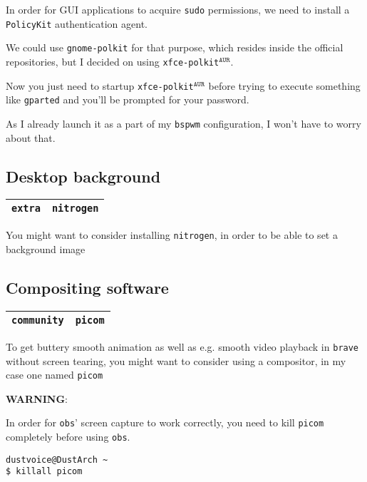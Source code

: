 \documentclass[9pt]{report}
\newcommand{\admonition}[2]{\textbf{#1}: {#2}}
\begin{document}
In order for GUI applications to acquire \texttt{sudo} permissions, we need to install a \texttt{PolicyKit} authentication agent.


We could use \texttt{gnome-polkit} for that purpose, which resides inside the official repositories, but I decided on using \texttt{xfce-polkit}${}^{\texttt{AUR}}$.


Now you just need to startup \texttt{xfce-polkit}${}^{\texttt{AUR}}$ before trying to execute something like \texttt{gparted} and you’ll be prompted for your password.


As I already launch it as a part of my \texttt{bspwm} configuration, I won’t have to worry about that.



\vfill\eject

\hypertarget{x-desktop-background}{\subsection{Desktop background}}
\begin{center}
\begin{tabular}{|c|c|}
\hline
\texttt{extra} & \texttt{nitrogen} \\ 
\hline
\end{tabular}
\end{center}

You might want to consider installing \texttt{nitrogen}, in order to be able to set a background image



\vfill\eject

\hypertarget{x-compositing-software}{\subsection{Compositing software}}
\begin{center}
\begin{tabular}{|c|c|}
\hline
\texttt{community} & \texttt{picom} \\ 
\hline
\end{tabular}
\end{center}

To get buttery smooth animation as well as e.g. smooth video playback in \texttt{brave} without screen tearing, you might want to consider using a compositor, in my case one named \texttt{picom}


\admonition{WARNING}{In order for \texttt{obs}' screen capture to work correctly, you need to kill \texttt{picom} completely before using \texttt{obs}.


}
\begin{verbatim}
dustvoice@DustArch ~
$ killall picom
\end{verbatim}
\end{document}
